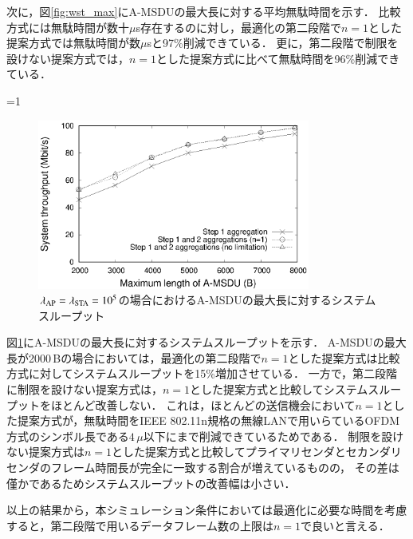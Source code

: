\documentclass[master]{kuisthesis}		%
\newcounter{flagFig}
\begin{document}
			次に，図\ref{fig:wst_max}にA-MSDUの最大長に対する平均無駄時間を示す．
			比較方式には無駄時間が数十$\mu$s存在するのに対し，最適化の第二段階で$n=1$とした提案方式では無駄時間が数$\mu$sと97\%削減できている．
			更に，第二段階で制限を設けない提案方式では，$n=1$とした提案方式に比べて無駄時間を96\%削減できている．
			\par
			\ifnum\value{flagFig}=1 {\begin{figure}[htbp]
				\begin{center}
					\includegraphics[width=0.8\textwidth]{graph/thr_max.eps}
					\caption{$\lambda_{\rm AP}=\lambda_{\rm STA}=10^5$の場合におけるA-MSDUの最大長に対するシステムスループット}
					\label{fig:thr_max}
				\end{center}
			\end{figure}}\fi
			図\ref{fig:thr_max}にA-MSDUの最大長に対するシステムスループットを示す．
			A-MSDUの最大長が2000\,Bの場合においては，最適化の第二段階で$n=1$とした提案方式は比較方式に対してシステムスループットを15\%増加させている．
			一方で，第二段階に制限を設けない提案方式は，$n=1$とした提案方式と比較してシステムスループットをほとんど改善しない．
			これは，ほとんどの送信機会において$n=1$とした提案方式が，無駄時間をIEEE 802.11n規格の無線LANで用いらているOFDM方式のシンボル長である$4\,\mu$以下にまで削減できているためである．
			制限を設けない提案方式は$n=1$とした提案方式と比較してプライマリセンダとセカンダリセンダのフレーム時間長が完全に一致する割合が増えているものの，
			その差は僅かであるためシステムスループットの改善幅は小さい．
			\par
			以上の結果から，本シミュレーション条件においては最適化に必要な時間を考慮すると，第二段階で用いるデータフレーム数の上限は$n=1$で良いと言える．
			\par
\end{document}
